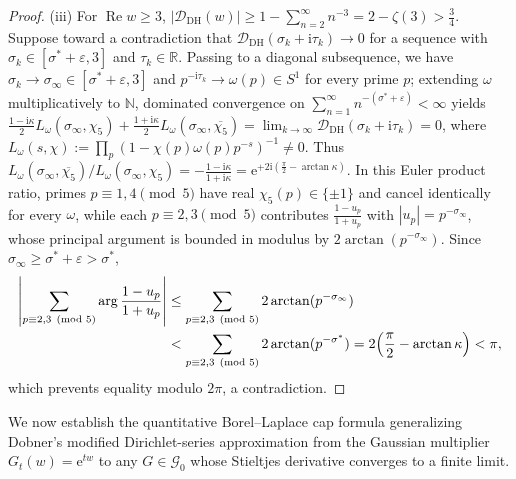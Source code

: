 \documentclass[11pt,a4paper,reqno]{amsart}
\theoremstyle{definition}
\theoremstyle{remark}
\numberwithin{equation}{section}
\newcommand{\R}{\mathbb{R}}
\newcommand{\N}{\mathbb{N}}
\newcommand{\ii}{\mathrm{i}}
\newcommand{\ee}{\mathrm{e}}
\DeclareMathOperator{\Reop}{Re}
\begin{document}
\begin{proof}
(iii) For $\Reop w \ge 3$, $|\mathcal{D}_{\mathrm{DH}}(w)| \ge 1 - \sum_{n=2}^{\infty} n^{-3} = 2 - \zeta(3) > \frac{3}{4}$. Suppose toward a contradiction that $\mathcal{D}_{\mathrm{DH}}(\sigma_k + \ii\tau_k) \to 0$ for a sequence with $\sigma_k \in [\sigma^* + \varepsilon, 3]$ and $\tau_k \in \R$. Passing to a diagonal subsequence, we have $\sigma_k \to \sigma_\infty \in [\sigma^* + \varepsilon, 3]$ and $p^{-\ii\tau_k} \to \omega(p) \in S^1$ for every prime $p$; extending $\omega$ multiplicatively to $\N$, dominated convergence on $\sum_{n=1}^{\infty} n^{-(\sigma^* + \varepsilon)} < \infty$ yields $\frac{1 - \ii\kappa}{2}L_\omega(\sigma_\infty,\chi_5) + \frac{1 + \ii\kappa}{2}L_\omega(\sigma_\infty,\overline{\chi_5}) = \lim_{k\to\infty}\mathcal{D}_{\mathrm{DH}}(\sigma_k + \ii\tau_k) = 0$, where $L_\omega(s,\chi) := \prod_p (1 - \chi(p)\omega(p)p^{-s})^{-1} \ne 0$. Thus $L_\omega(\sigma_\infty,\overline{\chi_5})/L_\omega(\sigma_\infty,\chi_5) = -\frac{1 - \ii\kappa}{1 + \ii\kappa} = \ee^{+2\ii(\frac{\pi}{2} - \arctan\kappa)}$. In this Euler product ratio, primes $p \equiv 1,4 \pmod{5}$ have real $\chi_5(p) \in \{\pm 1\}$ and cancel identically for every $\omega$, while each $p \equiv 2,3 \pmod{5}$ contributes $\frac{1 - u_p}{1 + u_p}$ with $|u_p| = p^{-\sigma_\infty}$, whose principal argument is bounded in modulus by $2\arctan(p^{-\sigma_\infty})$. Since $\sigma_\infty \ge \sigma^* + \varepsilon > \sigma^*$,
\begin{equation*}
  \begin{aligned}
    \left|\sum_{p \equiv 2,3 \pmod{5}} \arg\frac{1 - u_p}{1 + u_p}\right|
    &\le \sum_{p \equiv 2,3 \pmod{5}} 2\arctan(p^{-\sigma_\infty}) \\
    &< \sum_{p \equiv 2,3 \pmod{5}} 2\arctan(p^{-\sigma^*})
    = 2\Bigl(\frac{\pi}{2} - \arctan\kappa\Bigr) < \pi,
  \end{aligned}
\end{equation*}
which prevents equality modulo $2\pi$, a contradiction.
\end{proof}

We now establish the quantitative Borel--Laplace cap formula generalizing Dobner's modified Dirichlet-series approximation \cite[Lem.~2.3]{dobner2021} from the Gaussian multiplier $G_t(w) = \ee^{tw}$ to any $G \in \mathcal{G}_0$ whose Stieltjes derivative converges to a finite limit.
\end{document}
